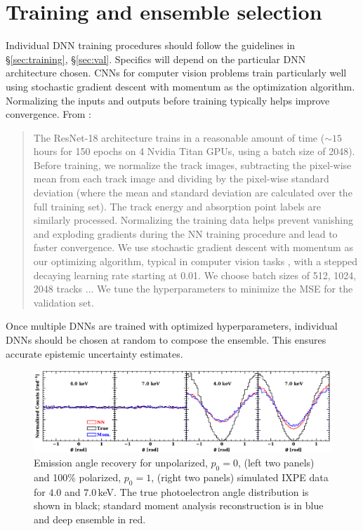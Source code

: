 \section{Training and ensemble selection}
\label{sec:trainens}
Individual DNN training procedures should follow the guidelines in \S\ref{sec:training}, \S\ref{sec:val}. Specifics will depend on the particular DNN architecture chosen. CNNs for computer vision problems train particularly well using stochastic gradient descent with momentum \citep{sutskever_importance_2013} as the optimization algorithm. Normalizing the inputs and outputs before training typically helps improve convergence. From \citet{peirson_deep_2021}:
\begin{quotation}
The ResNet-18 architecture trains in a reasonable amount of time ($\sim 15$ hours for 150 epochs on 4 Nvidia Titan GPUs, using a batch size of 2048). 
Before training, we normalize the track images, subtracting the pixel-wise mean from each track image and dividing by the pixel-wise standard deviation (where the mean and standard deviation are calculated over the full training set). The track energy and absorption point labels are similarly processed.
Normalizing the training data helps prevent vanishing and exploding gradients during the NN training procedure and lead to faster convergence. We use stochastic gradient descent with momentum as our optimizing algorithm, typical in computer vision tasks \citep{sutskever_importance_2013}, with a stepped decaying learning rate starting at 0.01.
We choose batch sizes of 512, 1024, 2048 tracks ... We tune the hyperparameters to minimize the MSE for the validation set.
\end{quotation}
Once multiple DNNs are trained with optimized hyperparameters, individual DNNs should be chosen at random to compose the ensemble. This ensures accurate epistemic uncertainty estimates.

\begin{figure}[t]
\centering
\includegraphics[width=1.0\textwidth]{figures/angle_flat.pdf}
\caption{Emission angle recovery for unpolarized, $p_0 = 0$, (left two panels) and 100\% polarized, $p_0 = 1$, (right two panels) simulated IXPE data for $4.0$ and $7.0$\,keV. The true photoelectron angle distribution is shown in black; standard moment analysis reconstruction is in blue and deep ensemble in red.}
\label{fig:angledist}
\end{figure}

